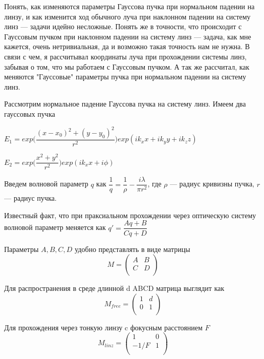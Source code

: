 Понять, как изменяются параметры Гауссова пучка при нормальном падении на линзу, и как изменится ход обычного луча при наклонном падении на систему линз --- задачи идейно несложные. Понять же в точности, что происходит с Гауссовым пучком при наклонном падении на систему линз --- задача, как мне кажется, очень нетривиальная, да и возможно такая точность нам не нужна. В связи с чем, я рассчитывал координаты луча при прохождении системы линз, забывая о том, что мы работаем с Гауссовым пучком. А так же рассчитал, как меняются "Гауссовые" параметры пучка при нормальном падении на систему линз.

Рассмотрим нормальное падение Гауссова пучка на систему линз. Имеем два гауссовых пучка


$E_{1} = exp\Big(\dfrac{(x - x_{0})^2  + (y - y_{0})^2}{r^2}\Big) exp(ik_{x} x + ik_{y} y + ik_{z} z)$


$E_{2} = exp\Big(\dfrac{x^2  + y^2}{r^2}\Big) exp(ik_{x} x + i\phi)$

Введем волновой параметр $q$ как $\dfrac{1}{q} = \dfrac{1}{\rho} - \dfrac{i \lambda}{\pi r^2}$, где $\rho$ --- радиус кривизны пучка, $r$ --- радиус пучка.

Известный факт, что при праксиальном прохождении через оптическую систему волновой параметр меняется как $q' = \dfrac{Aq + B}{Cq + D}$

Параметры $A, B, C, D$ удобно представлять в виде матрицы \begin{equation*}
M =
\begin{pmatrix}
A & B \\
C & D \\
\end{pmatrix}
\end{equation*}

Для распространения в среде длинной d ABCD матрица выглядит как 
 \begin{equation*}
M_{free} =
\begin{pmatrix}
1 & d \\
0 & 1 \\
\end{pmatrix}
\end{equation*}

Для прохождения через тонкую линзу c фокусным расстоянием $F$
 \begin{equation*}
M_{linz} =
\begin{pmatrix}
1 & 0 \\
-1/F & 1 \\
\end{pmatrix}
\end{equation*}

